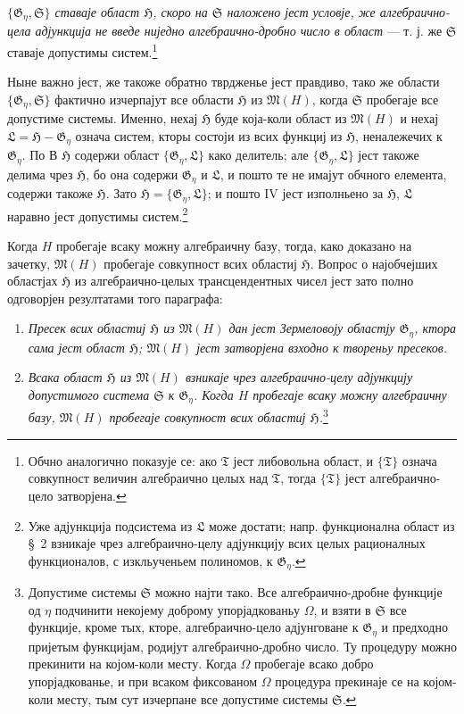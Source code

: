 ﻿\documentclass[11pt]{article}
\begin{document}
{\itshape $\{\mathfrak G_\eta,\mathfrak S\}$ ставаје област $\mathfrak H$,
скоро на $\mathfrak S$ наложено јест условје, же алгебраично-цела адјункција не
введе ниједно алгебраично-дробно число в област} --- т. ј. же $\mathfrak S$
ставаје допустимы систем.\footnote{Обчно аналогично показује се: ако
$\mathfrak T$ јест либовольна област, и $\{\mathfrak T\}$ означа совкупност
величин алгебраично целых над $\mathfrak T$, тогда $\{\mathfrak T\}$ јест
алгебраично-цело затворјена.}

Ныне важно јест, же такоже обратно тврдженье јест правдиво, тако же области
$\{\mathfrak G_\eta,\mathfrak S\}$ фактично изчерпајут все области
$\mathfrak H$ из $\mathfrak M(H)$, когда $\mathfrak S$ пробегаје все допустиме
системы. Именно, нехај $\mathfrak H$ буде која-коли област из $\mathfrak M(H)$
и нехај $\mathfrak L=\mathfrak H-\mathfrak G_\eta$ означа систем, кторы состоји
из всих функциј из $\mathfrak H$, неналежечих к $\mathfrak G_\eta$. По В
$\mathfrak H$ содержи област $\{\mathfrak G_\eta,\mathfrak L\}$ како делитель;
але $\{\mathfrak G_\eta,\mathfrak L\}$ јест такоже делима чрез $\mathfrak H$,
бо она содержи $\mathfrak G_\eta$ и $\mathfrak L$, и пошто те не имајут
обчного елемента, содержи такоже $\mathfrak H$. Зато
$\mathfrak H=\{\mathfrak G_\eta,\mathfrak L\}$; и пошто IV јест изполньено за
$\mathfrak H$, $\mathfrak L$ наравно јест допустимы систем.\footnote{Уже
адјункција подсистема из $\mathfrak L$ може достати; напр. функционална област
из \S\ 2 взникаје чрез алгебраично-целу адјункцију всих целых рационалных
функционалов, с изкльученьем полиномов, к $\mathfrak G_\eta$.}

Когда $H$ пробегаје всаку можну алгебраичну базу, тогда, како доказано на
зачетку, $\mathfrak M(H)$ пробегаје совкупност всих областиј $\mathfrak H$.
Вопрос о најобчејших областјах $\mathfrak H$ из алгебраично-целых
трансцендентных чисел јест зато полно одговорјен резултатами того параграфа:
\begin{enumerate}
\item[а)] {\itshape Пресек всих областиј $\mathfrak H$ из $\mathfrak M(H)$ дан
јест Зермеловоју областју $\mathfrak G_\eta$, ктора сама јест област
$\mathfrak H$; $\mathfrak M(H)$ јест затворјена взходно к твореньу пресеков.}
\item[б)] {\itshape Всака област $\mathfrak H$ из $\mathfrak M(H)$ взникаје
чрез алгебраично-целу адјункцију допустимого система $\mathfrak S$ к
$\mathfrak G_\eta$. Когда $H$ пробегаје всаку можну алгебраичну базу,
$\mathfrak M(H)$ пробегаје совкупност всих областиј $\mathfrak H$.}\footnote{Допустиме
системы $\mathfrak S$ можно најти тако. Все алгебраично-дробне функције од
$\eta$ подчинити некојему доброму упорјадкованьу $\Omega$, и взяти в
$\mathfrak S$ все функције, кроме тых, кторе, алгебраично-цело адјунговане к
$\mathfrak G_\eta$ и предходно пријетым функцијам, родијут алгебраично-дробно
число. Ту процедуру можно прекинити на којом-коли месту. Когда $\Omega$
пробегаје всако добро упорјадкованье, и при всаком фиксованом $\Omega$ процедура
прекинаје се на којом-коли месту, тым сут изчерпане все допустиме системы
$\mathfrak S$.}
\end{enumerate}
\end{document}
